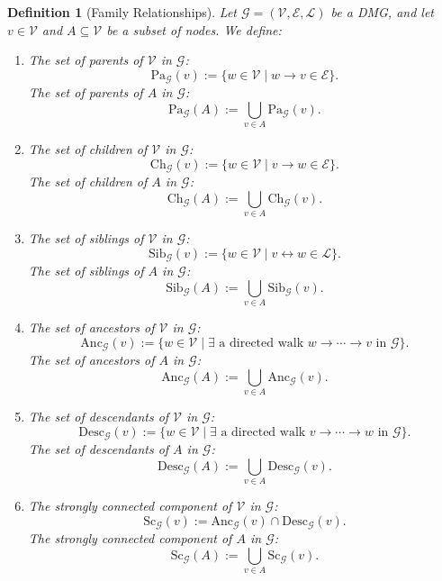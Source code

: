 \documentclass[accepted]{uai2025} %
\newtheorem{definition}{Definition}
\newcommand{\anc}{\text{Anc}}
\newcommand{\huh}{\mathrel{\leftrightarrow}}
\begin{document}
\begin{definition} [Family Relationships] \label{family relationships}
Let \( \mathcal{G} = (\mathcal{V},\mathcal{E},\mathcal{L}) \) be a DMG, and let \( v \in \mathcal{V} \) and \( A \subseteq \mathcal{V} \) be a subset of nodes. We define:  
\begin{enumerate}  
    \item The set of \emph{parents} of \( \mathcal{V} \) in \( \mathcal{G} \):  
    \[
    \text{Pa}_\mathcal{G}(v) := \{ w \in \mathcal{V} \mid w \rightarrow v \in \mathcal{E} \}.
    \]
    The set of \emph{parents} of \( A \) in \( \mathcal{G} \):  
    \[
    \text{Pa}_\mathcal{G}(A) := \bigcup_{v \in A} \text{Pa}_\mathcal{G}(v).
    \]
    
    \item The set of \emph{children} of \( \mathcal{V} \) in \( \mathcal{G} \):  
    \[
    \text{Ch}_\mathcal{G}(v) := \{ w \in \mathcal{V} \mid v \rightarrow w \in \mathcal{E} \}.
    \]
    The set of \emph{children} of \( A \) in \( \mathcal{G} \):  
    \[
    \text{Ch}_\mathcal{G}(A) := \bigcup_{v \in A} \text{Ch}_\mathcal{G}(v).
    \]

    \item The set of \emph{siblings} of \( \mathcal{V} \) in \( \mathcal{G} \):  
    \[
    \text{Sib}_\mathcal{G}(v) := \{ w \in \mathcal{V} \mid v \huh  w \in \mathcal{L} \}.
    \]
    The set of \emph{siblings} of \( A \) in \( \mathcal{G} \):  
    \[
    \text{Sib}_\mathcal{G}(A) := \bigcup_{v \in A} \text{Sib}_\mathcal{G}(v).
    \]

    \item The set of \emph{ancestors} of \( \mathcal{V} \) in \( \mathcal{G} \):  
    \[
    \anc_\mathcal{G}(v) := \{ w \in \mathcal{V} \mid \exists \text{ a directed walk } w \rightarrow \cdots \rightarrow v \text{ in } \mathcal{G} \}.
    \]
    The set of \emph{ancestors} of \( A \) in \( \mathcal{G} \):  
    \[
    \anc_\mathcal{G}(A) := \bigcup_{v \in A} \anc_\mathcal{G}(v).
    \]

    \item The set of \emph{descendants} of \( \mathcal{V} \) in \( \mathcal{G} \):  
    \[
    \text{Desc}_\mathcal{G}(v) := \{ w \in \mathcal{V} \mid \exists \text{ a directed walk } v \rightarrow \cdots \rightarrow w \text{ in } \mathcal{G} \}.
    \]
    The set of \emph{descendants} of \( A \) in \( \mathcal{G} \):  
    \[
    \text{Desc}_\mathcal{G}(A) := \bigcup_{v \in A} \text{Desc}_\mathcal{G}(v).
    \]

    \item The \emph{strongly connected component} of \( \mathcal{V} \) in \( \mathcal{G} \):  
    \[
    \text{Sc}_\mathcal{G}(v) := \anc_\mathcal{G}(v) \cap \text{Desc}_\mathcal{G}(v).
    \]
    The \emph{strongly connected component} of \( A \) in \( \mathcal{G} \):  
    \[
    \text{Sc}_\mathcal{G}(A) := \bigcup_{v \in A} \text{Sc}_\mathcal{G}(v).
    \]
\end{enumerate}  
\end{definition}
\end{document}
